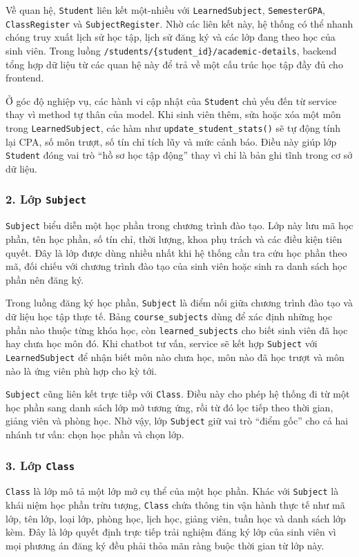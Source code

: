 \documentclass[12pt,a4paper]{report}
\begin{document}
Về quan hệ, \texttt{Student} liên kết một-nhiều với \texttt{LearnedSubject}, \texttt{SemesterGPA}, \texttt{ClassRegister} và \texttt{SubjectRegister}. Nhờ các liên kết này, hệ thống có thể nhanh chóng truy xuất lịch sử học tập, lịch sử đăng ký và các lớp đang theo học của sinh viên. Trong luồng \texttt{/students/\{student\_id\}/academic-details}, backend tổng hợp dữ liệu từ các quan hệ này để trả về một cấu trúc học tập đầy đủ cho frontend.

Ở góc độ nghiệp vụ, các hành vi cập nhật của \texttt{Student} chủ yếu đến từ service thay vì method tự thân của model. Khi sinh viên thêm, sửa hoặc xóa một môn trong \texttt{LearnedSubject}, các hàm như \texttt{update\_student\_stats()} sẽ tự động tính lại CPA, số môn trượt, số tín chỉ tích lũy và mức cảnh báo. Điều này giúp lớp \texttt{Student} đóng vai trò “hồ sơ học tập động” thay vì chỉ là bản ghi tĩnh trong cơ sở dữ liệu.

\subsubsection{2. Lớp \texttt{Subject}}
\texttt{Subject} biểu diễn một học phần trong chương trình đào tạo. Lớp này lưu mã học phần, tên học phần, số tín chỉ, thời lượng, khoa phụ trách và các điều kiện tiên quyết. Đây là lớp được dùng nhiều nhất khi hệ thống cần tra cứu học phần theo mã, đối chiếu với chương trình đào tạo của sinh viên hoặc sinh ra danh sách học phần nên đăng ký.

Trong luồng đăng ký học phần, \texttt{Subject} là điểm nối giữa chương trình đào tạo và dữ liệu học tập thực tế. Bảng \texttt{course\_subjects} dùng để xác định những học phần nào thuộc từng khóa học, còn \texttt{learned\_subjects} cho biết sinh viên đã học hay chưa học môn đó. Khi chatbot tư vấn, service sẽ kết hợp \texttt{Subject} với \texttt{LearnedSubject} để nhận biết môn nào chưa học, môn nào đã học trượt và môn nào là ứng viên phù hợp cho kỳ tới.

\texttt{Subject} cũng liên kết trực tiếp với \texttt{Class}. Điều này cho phép hệ thống đi từ một học phần sang danh sách lớp mở tương ứng, rồi từ đó lọc tiếp theo thời gian, giảng viên và phòng học. Nhờ vậy, lớp \texttt{Subject} giữ vai trò “điểm gốc” cho cả hai nhánh tư vấn: chọn học phần và chọn lớp.

\subsubsection{3. Lớp \texttt{Class}}
\texttt{Class} là lớp mô tả một lớp mở cụ thể của một học phần. Khác với \texttt{Subject} là khái niệm học phần trừu tượng, \texttt{Class} chứa thông tin vận hành thực tế như mã lớp, tên lớp, loại lớp, phòng học, lịch học, giảng viên, tuần học và danh sách lớp kèm. Đây là lớp quyết định trực tiếp trải nghiệm đăng ký lớp của sinh viên vì mọi phương án đăng ký đều phải thỏa mãn ràng buộc thời gian từ lớp này.
\end{document}
